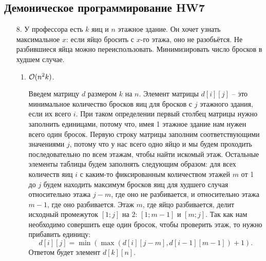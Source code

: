 \subsection{Демоническое программирование HW7}
\begin{enumerate}
    \item[8.] У профессора есть $k$ яиц и $n$ этажное здание. Он хочет узнать максимальное $x$: если яйцо бросить с $x$-го этажа, оно не разобьётся. Не разбившиеся яйца можно переиспользовать. Минимизировать число бросков в худшем случае.
    \begin{enumerate}
        \item $\mathcal{O}(n^2 k)$.
        \begin{solution}
            Введем матрицу $d$ размером $k$ на $n$. Элемент матрицы $d[i][j]$ -- это минимальное количество бросков яиц для бросков с $j$ этажного здания, если их всего $i$. При таком определении первый столбец матрицы нужно заполнить единицами, потому что, имея 1 этажное здание нам нужен всего один бросок. Первую строку матрицы заполним соответствующими значениями $j$, потому что у нас всего одно яйцо и мы будем проходить последовательно по всем этажам, чтобы найти искомый этаж. Остальные элементы таблицы будем заполнять следующим образом: для всех количеств яиц $i$ с каким-то фиксированным количеством этажей $m$ от 1 до $j$ будем находить максимум бросков яиц для худшего случая относительно этажа $j-m$, где оно не разбивается, и относительно этажа $m-1$, где оно разбивается. Этаж $m$, где яйцо разбивается, делит исходный промежуток $[1; j]$ на 2: $[1; m-1]$ и $[m; j]$. Так как нам необходимо совершить еще один бросок, чтобы проверить этаж, то нужно прибавить единицу:
            \begin{equation}
                d[i][j] = \min(\max(d[i][j-m], d[i-1][m-1])+1).
            \end{equation}
            Ответом будет элемент $d[k][n]$.


\end{solution}
\end{enumerate}
\end{enumerate}
